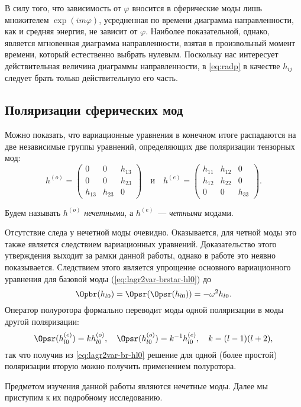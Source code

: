 \documentclass[\docroot/reports/draft/report.tex]{subfiles}
\begin{document}
    В силу того, что зависимость от $\varphi$ вносится в сферические моды лишь множителем $\exp(im\varphi)$, усредненная по времени диаграмма направленности, как и средняя энергия, не зависит от $\varphi$. Наиболее показательной, однако, является мгновенная диаграмма направленности, взятая в произвольный момент времени, который естественно выбрать нулевым. Поскольку нас интересует действительная величина диаграммы направленности, в \autoref{eq:radp} в качестве $h_{ij}$ следует брать только действительную его часть.

\subsection{Поляризации сферических мод}

    Можно показать, что вариационные уравнения в конечном итоге распадаются на две независимые группы уравнений, определяющих две поляризации тензорных мод:
    \begin{equation}
        h^{(o)} = \begin{pmatrix}0&0&h_{13}\\0&0&h_{23}\\h_{13}&h_{23}&0\end{pmatrix} \quad\text{и}\quad
        h^{(e)} = \begin{pmatrix}h_{11}&h_{12}&0\\h_{12}&h_{22}&0\\0&0&h_{33}\end{pmatrix} .
    \end{equation}

    Будем называть $h^{(o)}$ \textit{нечетными}, а $h^{(e)}$~--- \textit{четными} модами.

    Отсутствие следа у нечетной моды очевидно. Оказывается, для четной моды это также является следствием вариационных уравнений. Доказательство этого утверждения выходит за рамки данной работы, однако в работе  это неявно показывается. Следствием этого является упрощение основного вариационного уравнения для базовой моды (\autoref{eq:lagr2var-brstar-hl0}) до
    \begin{equation}\label{eq:lagr2var-br-hl0}
        \Opbr(h_{l0}) = \Opsr(\Opsr(h_{l0})) = - \omega^2 h_{l0} .
    \end{equation}
    Оператор полуротора формально переводит моды одной поляризации в моды другой поляризации:
    \begin{equation}\label{eq:sr-he-ho}
        \Opsr(h_{l0}^{(e)}) = k h_{l0}^{(o)}, \quad \Opsr(h_{l0}^{(o)}) = k^{-1} h_{l0}^{(e)}, \quad k = (l-1)(l+2) ,
    \end{equation}
    так что получив из \autoref{eq:lagr2var-br-hl0} решение для одной (более простой) поляризации вторую можно получить применением полуротора.

    Предметом изучения данной работы являются нечетные моды. Далее мы приступим к их подробному исследованию.


\end{document}
